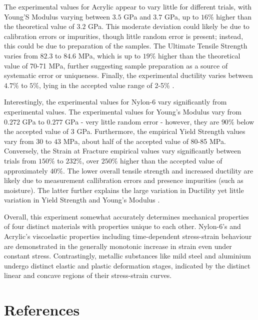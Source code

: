 \documentclass{article}
\begin{document}
The experimental values for Acrylic appear to vary little for different trials, with Young'S Modulus varying between $3.5$ GPa and $3.7$ GPa, up to $16\%$ higher than the theoretical value of $3.2$ GPa. This moderate deviation could likely be due to calibration errors or impurities, though little random error is present; instead, this could be due to preparation of the samples. The Ultimate Tensile Strength varies from $82.3$ to $84.6$ MPa, which is up to $19\%$ higher than the theoretical value of 70-71 MPa, further suggesting sample preparation as a source of systematic error or uniqueness. Finally, the experimental ductility varies between $4.7\%$ to $5\%$, lying in the accepted value range of 2-5\% \cite{Acrylic0} \cite{Acrylic1} \cite{Acrylic2}.

Interestingly, the experimental values for Nylon-6 vary significantly from experimental values. The experimental values for Young's Modulus vary from $0.272$ GPa to $0.277$ GPa - very little random error - however, they are $90\%$ below the accepted value of $3$ GPa. Furthermore, the empirical Yield Strength values vary from $30$ to $43$ MPa, about half of the accepted value of 80-85 MPa. Conversely, the Strain at Fracture empirical values vary significantly between trials from $150\%$ to $232\%$, over $250\%$ higher than the accepted value of approximately $40\%$. The lower overall tensile strength and increased ductility are likely due to measurement callibration errors and presence  impurities (such as moisture). The latter further explains the large variation in Ductility yet little variation in Yield Strength and Young's Modulus \cite{Nylon6_0} \cite{Nylon6_1}.

Overall, this experiment somewhat accurately determines mechanical properties of four distinct materials with properties unique to each other. Nylon-6's and Acrylic's viscoelastic properties including time-dependent stress-strain behaviour are demonstrated in the generally monotonic increase in strain even under constant stress. Contrastingly, metallic substances like mild steel and aluminium undergo distinct elastic and plastic deformation stages, indicated by the distinct linear and concave regions of their stress-strain curves.

\section{References}
\printbibliography
\end{document}
